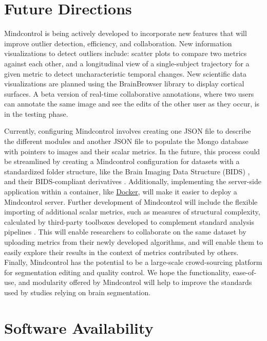 \section{Future Directions}

Mindcontrol is being actively developed to incorporate new features that will improve outlier detection, efficiency, and collaboration. New information visualizations to detect outliers include: scatter plots to compare two metrics against each other, and a longitudinal view of a single-subject trajectory for a given metric to detect uncharacteristic temporal changes. New scientific data visualizations are planned using the BrainBrowser library \cite{Sherif_2015} to display cortical surfaces. A beta version of real-time collaborative annotations, where two users can annotate the same image and see the edits of the other user as they occur, is in the testing phase. 

Currently, configuring Mindcontrol involves creating one JSON file to describe the different modules and another JSON file to populate the Mongo database with pointers to images and their scalar metrics. In the future, this process could be streamlined by creating a Mindcontrol configuration for datasets with a standardized folder structure, like the Brain Imaging Data Structure (BIDS) \cite{Gorgolewski_2016}, and their BIDS-compliant derivatives \cite{gorgolewski2016bids}. Additionally, implementing the server-side application within a container, like \href{https://www.docker.com/}{Docker}, will make it easier to deploy a Mindcontrol server. Further development of Mindcontrol will include the flexible importing of additional scalar metrics, such as measures of structural complexity, calculated by third-party toolboxes developed to complement standard analysis pipelines \cite{madan2016,madan2017}. This will enable researchers to collaborate on the same dataset by uploading metrics from their newly developed algorithms, and will enable them to easily explore their results in the context of metrics contributed by others. Finally, Mindcontrol has the potential to be a large-scale crowd-sourcing platform for segmentation editing and quality control. We hope the functionality, ease-of-use, and modularity offered by Mindcontrol will help to improve the standards used by studies relying on brain segmentation. 
\section{Software Availability}

